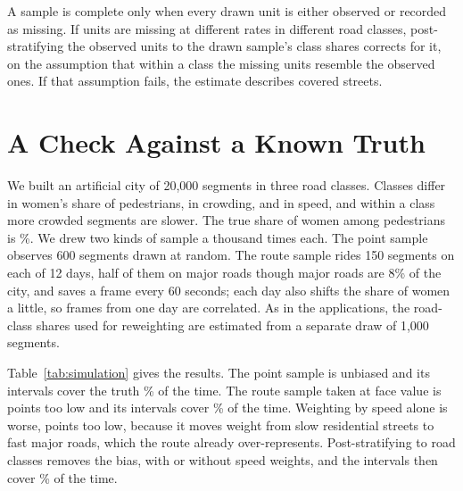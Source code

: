 \documentclass[11pt]{article}
\begin{document}
A sample is complete only when every drawn unit is either observed or recorded as missing. If units are missing at different rates in different road classes, post-stratifying the observed units to the drawn sample's class shares corrects for it, on the assumption that within a class the missing units resemble the observed ones. If that assumption fails, the estimate describes covered streets.

\section{A Check Against a Known Truth}

We built an artificial city of 20,000 segments in three road classes. Classes differ in women's share of pedestrians, in crowding, and in speed, and within a class more crowded segments are slower. The true share of women among pedestrians is \simtruth\%. We drew two kinds of sample a thousand times each. The point sample observes 600 segments drawn at random. The route sample rides 150 segments on each of 12 days, half of them on major roads though major roads are 8\% of the city, and saves a frame every 60 seconds; each day also shifts the share of women a little, so frames from one day are correlated. As in the applications, the road-class shares used for reweighting are estimated from a separate draw of 1,000 segments.

\begin{table}[H]
\centering
\caption{Estimates of women's share of pedestrians in a simulated city where the true share is \simtruth\%. Each row summarizes 1,000 samples. ``Per minute'' weights frames equally; ``per meter'' weights each frame by speed; ``road classes only'' post-stratifies road classes to their shares in a drawn sample of 1,000 segments without speed weights; ``road network'' does both. Mean and SD are the mean and standard deviation of the estimates across samples, bias is the mean minus the truth, SE is the mean estimated standard error, and coverage is the share of nominal 95\% intervals that contain the truth.}
\label{tab:simulation}
\end{table}

Table~\ref{tab:simulation} gives the results. The point sample is unbiased and its intervals cover the truth \simcoveragepointsample\% of the time. The route sample taken at face value is \simbiasrouteperminute{} points too low and its intervals cover \simcoveragerouteperminute\% of the time. Weighting by speed alone is worse, \simbiasroutepermeter{} points too low, because it moves weight from slow residential streets to fast major roads, which the route already over-represents. Post-stratifying to road classes removes the bias, with or without speed weights, and the intervals then cover \simcoveragerouteroadnetwork\% of the time.
\end{document}
